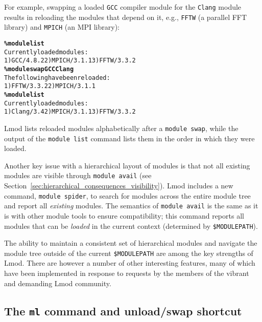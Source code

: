 For example, swapping a loaded \texttt{\small GCC} compiler module for the
\texttt{\small {Clang}} module results in reloading the modules that
depend on it, e.g., \texttt{\small FFTW} (a parallel FFT library) and
\texttt{\small MPICH} (an MPI library):
{\small
  \begin{alltt}
    \textbf{\% module list}
    Currently loaded modules:
    1) GCC/4.8.2  2) MPICH/3.1.1  3) FFTW/3.3.2
    \textbf{\% module swap GCC Clang}
    The following have been reloaded:
    1) FFTW/3.3.2  2) MPICH/3.1.1
    \textbf{\% module list}
    Currently loaded modules:
    1) Clang/3.4  2) MPICH/3.1.1  3) FFTW/3.3.2
\end{alltt}
}
\noindent
Lmod lists reloaded modules
alphabetically after a \texttt{\small module swap}, while the output of
the \texttt{\small module list} command lists them in the order in which
they were loaded.

Another key issue with a hierarchical layout of modules is that not all
existing modules are visible through \texttt{\small module avail} (see
Section~\ref{sec:hierarchical_consequences_visibility}). Lmod includes a
new command, \texttt{\small module spider}, to search for modules across the
entire module tree and report all \emph{existing} modules. The semantics of
\texttt{\small module avail} is the same as it is with other module tools to ensure
compatibility; this command reports all modules that can be \emph{loaded} in the
current context (determined by \texttt{\small \$MODULEPATH}).

The ability to maintain a consistent set of hierarchical modules and navigate the
module tree outside of the current \texttt{\small \$MODULEPATH} are among the key
strengths of Lmod. There are however a number of other interesting features, many
of which have been implemented in response to requests by the members of the
vibrant and demanding Lmod community. 

\subsection{The \texttt{\small ml} command and unload/swap shortcut}


